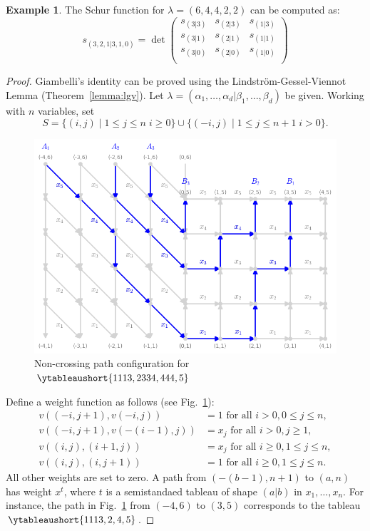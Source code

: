 \documentclass[11pt]{amsart}
\theoremstyle{definition}
\theoremstyle{example}
\newtheorem{example}[theorem]{Example}
\begin{document}
\begin{example}
  The Schur function for $\lambda=(6,4,4,2,2)$ can be computed as:
  \begin{displaymath}
    s_{(3,2,1|3,1,0)} = \det
    \begin{pmatrix}
      s_{(3|3)} & s_{(2|3)} & s_{(1|3)}\\
      s_{(3|1)} & s_{(2|1)} & s_{(1|1)}\\
      s_{(3|0)} & s_{(2|0)} & s_{(1|0)}\\
    \end{pmatrix}
  \end{displaymath}
\end{example}
\begin{proof}
  Giambelli's identity can be proved using the Lindstr\"om-Gessel-Viennot Lemma (Theorem~\ref{lemma:lgv}).
  Let $\lambda=(\alpha_1,\dotsc,\alpha_d|\beta_1,\dotsc,\beta_d)$ be given.
  Working with $n$ variables, set
  \begin{displaymath}
    S = \{(i,j)\mid 1\leq j \leq n\; i\geq 0\} \cup \{(-i,j)\mid 1\leq j\leq n+1\; i>0\}.
  \end{displaymath}
  \begin{figure}[h]
    \centering
    \includegraphics[width=\textwidth]{giambelli.png}
    \caption{Non-crossing path configuration for \tiny{$\ytableaushort{1113,2334,444,5}$}}
    \label{fig:giambelli}
  \end{figure}
  Define a weight function as follows (see Fig.~\ref{fig:giambelli}):
  \begin{align*}
    v((-i,j+1), v(-i,j)) & = 1 \text{ for all } i> 0, 0 \leq j \leq n,\\
    v((-i,j+1), v(-(i-1),j)) & = x_j \text{ for all } i>0, j\geq 1,\\
    v((i,j), (i+1,j)) & = x_j \text{ for all } i\geq 0, 1\leq j\leq n,\\
    v((i,j),(i,j+1)) & = 1 \text{ for all } i\geq 0, 1\leq j \leq n.
  \end{align*}
  All other weights are set to zero.
  A path from $(-(b-1),n+1)$ to $(a,n)$ has weight $x^t$, where $t$ is a semistandaed tableau of shape $(a|b)$ in $x_1,\dotsc,x_n$.
  For instance, the path in Fig.~\ref{fig:giambelli} from $(-4,6)$ to $(3,5)$ corresponds to the tableau $\ytableaushort{1113,2,4,5}$.


\end{proof}
\end{document}
